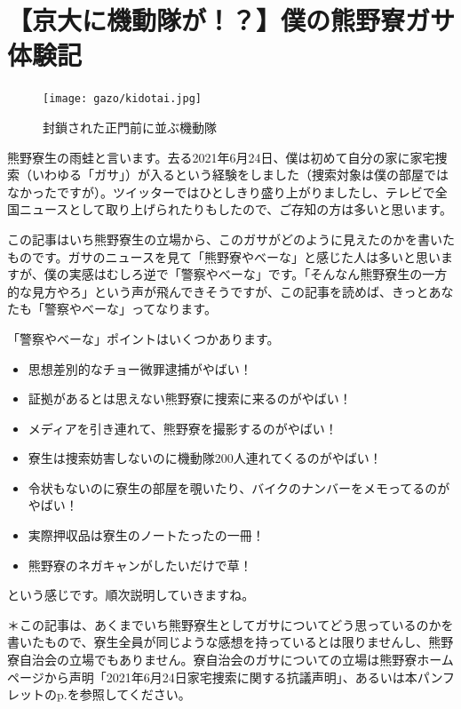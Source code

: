 
\section{【京大に機動隊が！？】僕の熊野寮ガサ体験記}\label{sec:gasataiken}


\begin{figure}[h]
  \centering
  \texttt{[image: gazo/kidotai.jpg]}
  \caption*{{\small 封鎖された正門前に並ぶ機動隊}}
\end{figure}



熊野寮生の雨蛙と言います。去る2021年6月24日、僕は初めて自分の家に家宅捜索（いわゆる「ガサ」）が入るという経験をしました（捜索対象は僕の部屋ではなかったですが）。ツイッターではひとしきり盛り上がりましたし、テレビで全国ニュースとして取り上げられたりもしたので、ご存知の方は多いと思います。

この記事はいち熊野寮生の立場から、このガサがどのように見えたのかを書いたものです。ガサのニュースを見て「熊野寮やべーな」と感じた人は多いと思いますが、僕の実感はむしろ逆で「警察やべーな」です。「そんなん熊野寮生の一方的な見方やろ」という声が飛んできそうですが、この記事を読めば、きっとあなたも「警察やべーな」ってなります。

「警察やべーな」ポイントはいくつかあります。

\begin{itemize}
  \item 思想差別的なチョー微罪逮捕がやばい！
  \item 証拠があるとは思えない熊野寮に捜索に来るのがやばい！
  \item メディアを引き連れて、熊野寮を撮影するのがやばい！
  \item 寮生は捜索妨害しないのに機動隊200人連れてくるのがやばい！
  \item 令状もないのに寮生の部屋を覗いたり、バイクのナンバーをメモってるのがやばい！
  \item 実際押収品は寮生のノートたったの一冊！
  \item 熊野寮のネガキャンがしたいだけで草！
\end{itemize}

という感じです。順次説明していきますね。

\noindent ＊この記事は、あくまでいち熊野寮生としてガサについてどう思っているのかを書いたもので、寮生全員が同じような感想を持っているとは限りませんし、熊野寮自治会の立場でもありません。寮自治会のガサについての立場は熊野寮ホームページから声明「2021年6月24日家宅捜索に関する抗議声明」、あるいは本パンフレットのp.\pageref{sec:gasa_jiti}を参照してください。

